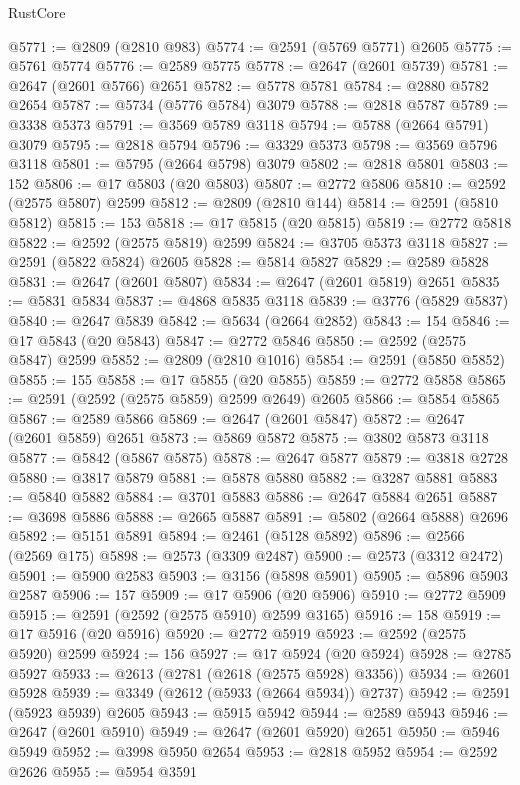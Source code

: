 \begin{lexlean}{RustCore}
\begin{coremodule}
@5771 := @2809 (@2810 @983)
@5774 := @2591 (@5769 @5771) @2605
@5775 := @5761 @5774
@5776 := @2589 @5775
@5778 := @2647 (@2601 @5739)
@5781 := @2647 (@2601 @5766) @2651
@5782 := @5778 @5781
@5784 := @2880 @5782 @2654
@5787 := @5734 (@5776 @5784) @3079
@5788 := @2818 @5787
@5789 := @3338 @5373
@5791 := @3569 @5789 @3118
@5794 := @5788 (@2664 @5791) @3079
@5795 := @2818 @5794
@5796 := @3329 @5373
@5798 := @3569 @5796 @3118
@5801 := @5795 (@2664 @5798) @3079
@5802 := @2818 @5801
@5803 := 152
@5806 := @17 @5803 (@20 @5803)
@5807 := @2772 @5806
@5810 := @2592 (@2575 @5807) @2599
@5812 := @2809 (@2810 @144)
@5814 := @2591 (@5810 @5812)
@5815 := 153
@5818 := @17 @5815 (@20 @5815)
@5819 := @2772 @5818
@5822 := @2592 (@2575 @5819) @2599
@5824 := @3705 @5373 @3118
@5827 := @2591 (@5822 @5824) @2605
@5828 := @5814 @5827
@5829 := @2589 @5828
@5831 := @2647 (@2601 @5807)
@5834 := @2647 (@2601 @5819) @2651
@5835 := @5831 @5834
@5837 := @4868 @5835 @3118
@5839 := @3776 (@5829 @5837)
@5840 := @2647 @5839
@5842 := @5634 (@2664 @2852)
@5843 := 154
@5846 := @17 @5843 (@20 @5843)
@5847 := @2772 @5846
@5850 := @2592 (@2575 @5847) @2599
@5852 := @2809 (@2810 @1016)
@5854 := @2591 (@5850 @5852)
@5855 := 155
@5858 := @17 @5855 (@20 @5855)
@5859 := @2772 @5858
@5865 := @2591 (@2592 (@2575 @5859) @2599 @2649) @2605
@5866 := @5854 @5865
@5867 := @2589 @5866
@5869 := @2647 (@2601 @5847)
@5872 := @2647 (@2601 @5859) @2651
@5873 := @5869 @5872
@5875 := @3802 @5873 @3118
@5877 := @5842 (@5867 @5875)
@5878 := @2647 @5877
@5879 := @3818 @2728
@5880 := @3817 @5879
@5881 := @5878 @5880
@5882 := @3287 @5881
@5883 := @5840 @5882
@5884 := @3701 @5883
@5886 := @2647 @5884 @2651
@5887 := @3698 @5886
@5888 := @2665 @5887
@5891 := @5802 (@2664 @5888) @2696
@5892 := @5151 @5891
@5894 := @2461 (@5128 @5892)
@5896 := @2566 (@2569 @175)
@5898 := @2573 (@3309 @2487)
@5900 := @2573 (@3312 @2472)
@5901 := @5900 @2583
@5903 := @3156 (@5898 @5901)
@5905 := @5896 @5903 @2587
@5906 := 157
@5909 := @17 @5906 (@20 @5906)
@5910 := @2772 @5909
@5915 := @2591 (@2592 (@2575 @5910) @2599 @3165)
@5916 := 158
@5919 := @17 @5916 (@20 @5916)
@5920 := @2772 @5919
@5923 := @2592 (@2575 @5920) @2599
@5924 := 156
@5927 := @17 @5924 (@20 @5924)
@5928 := @2785 @5927
@5933 := @2613 (@2781 (@2618 (@2575 @5928) @3356))
@5934 := @2601 @5928
@5939 := @3349 (@2612 (@5933 (@2664 @5934)) @2737)
@5942 := @2591 (@5923 @5939) @2605
@5943 := @5915 @5942
@5944 := @2589 @5943
@5946 := @2647 (@2601 @5910)
@5949 := @2647 (@2601 @5920) @2651
@5950 := @5946 @5949
@5952 := @3998 @5950 @2654
@5953 := @2818 @5952
@5954 := @2592 @2626
@5955 := @5954 @3591

\end{coremodule}
\end{lexlean}
